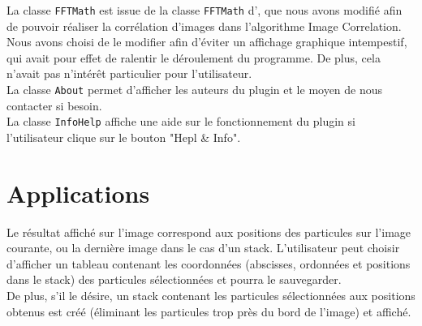 La classe \texttt{FFTMath} est issue de la classe \texttt{FFTMath} d'\imj, que nous avons modifié afin de pouvoir réaliser la corrélation d'images dans l'algorithme Image Correlation. Nous avons choisi de le modifier afin d'éviter un affichage graphique intempestif, qui avait pour effet de ralentir le déroulement du programme. De plus, cela n'avait pas n'intérêt particulier pour l'utilisateur. \\

La classe \texttt{About} permet d'afficher les auteurs du plugin et le moyen de nous contacter si besoin. \\

La classe \texttt{InfoHelp} affiche une aide sur le fonctionnement du plugin si l'utilisateur  clique sur le bouton "Hepl \& Info". 

\section{Applications}

Le résultat affiché sur l'image correspond aux positions des particules sur l'image courante, ou la dernière image dans le cas d'un stack.
L'utilisateur peut choisir d'afficher un tableau contenant les coordonnées (abscisses, ordonnées et positions dans le stack) des particules sélectionnées et pourra le sauvegarder. \\
De plus, s'il le désire, un stack contenant les particules sélectionnées aux positions obtenus est créé (éliminant les particules trop près du bord de l'image) et affiché.

